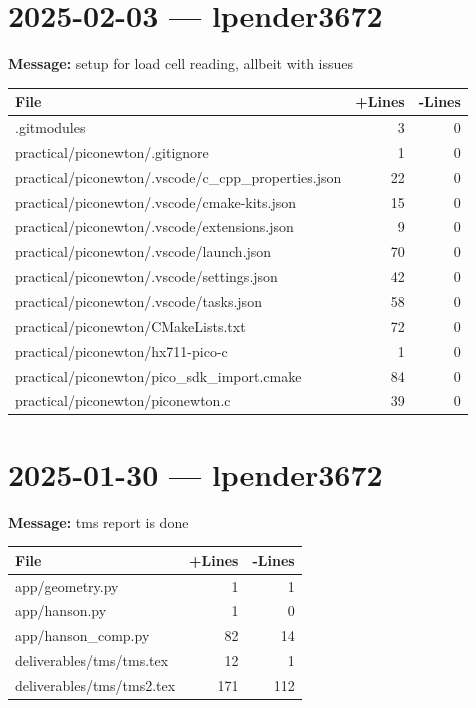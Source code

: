 \documentclass{article}
\begin{document}
\section*{2025-02-03 --- lpender3672}
\textbf{Message:} setup for load cell reading, allbeit with issues

\begin{longtable}{|p{10cm}|r|r|}
\hline \textbf{File} & \textbf{+Lines} & \textbf{-Lines} \\
\hline
.gitmodules & 3 & 0 \\
\hline
practical/piconewton/.gitignore & 1 & 0 \\
\hline
practical/piconewton/.vscode/c\_cpp\_properties.json & 22 & 0 \\
\hline
practical/piconewton/.vscode/cmake-kits.json & 15 & 0 \\
\hline
practical/piconewton/.vscode/extensions.json & 9 & 0 \\
\hline
practical/piconewton/.vscode/launch.json & 70 & 0 \\
\hline
practical/piconewton/.vscode/settings.json & 42 & 0 \\
\hline
practical/piconewton/.vscode/tasks.json & 58 & 0 \\
\hline
practical/piconewton/CMakeLists.txt & 72 & 0 \\
\hline
practical/piconewton/hx711-pico-c & 1 & 0 \\
\hline
practical/piconewton/pico\_sdk\_import.cmake & 84 & 0 \\
\hline
practical/piconewton/piconewton.c & 39 & 0 \\
\hline
\end{longtable}

\section*{2025-01-30 --- lpender3672}
\textbf{Message:} tms report is done

\begin{longtable}{|p{10cm}|r|r|}
\hline \textbf{File} & \textbf{+Lines} & \textbf{-Lines} \\
\hline
app/geometry.py & 1 & 1 \\
\hline
app/hanson.py & 1 & 0 \\
\hline
app/hanson\_comp.py & 82 & 14 \\
\hline
deliverables/tms/tms.tex & 12 & 1 \\
\hline
deliverables/tms/tms2.tex & 171 & 112 \\
\hline
\end{longtable}
\end{document}
